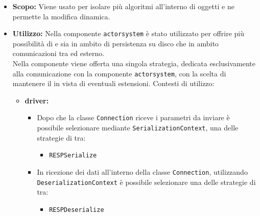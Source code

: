 \documentclass{scalatekids-article}
\begin{document}
\begin{itemize}
\item \textbf{Scopo:} Viene usato per isolare più algoritmi all'interno di oggetti e
  ne permette la modifica dinamica.
\item \textbf{Utilizzo:} Nella componente \verb=actorsystem= è stato utilizzato
  per offrire più possibilità di  e  sia in
  ambito di persistenza su disco che in ambito comunicazioni tra  ed
  esterno.\\ Nella componente  viene offerta una singola
  strategia, dedicata esclusivamente alla comunicazione con la componente
  \verb=actorsystem=, con la scelta di mantenere il  in
  vista di eventuali estensioni. Contesti di utilizzo:
  \begin{itemize}

  \item \textbf{driver:}
    \begin{itemize}
    \item Dopo che la classe \verb=Connection= riceve i parametri da inviare è
      possibile selezionare mediante \verb=SerializationContext=, una delle
      strategie di  tra:
      \begin{itemize}
      \item \verb=RESPSerialize=
      \end{itemize}
    \end{itemize}
    \begin{itemize}
    \item In ricezione dei dati all'interno della classe \verb=Connection=, utilizzando
      \verb=DeserializationContext= è possibile selezionare una delle
      strategie di  tra:
      \begin{itemize}
      \item \verb=RESPDeserialize=
      \end{itemize}
    \end{itemize}


\end{itemize}
\end{itemize}
\end{document}
